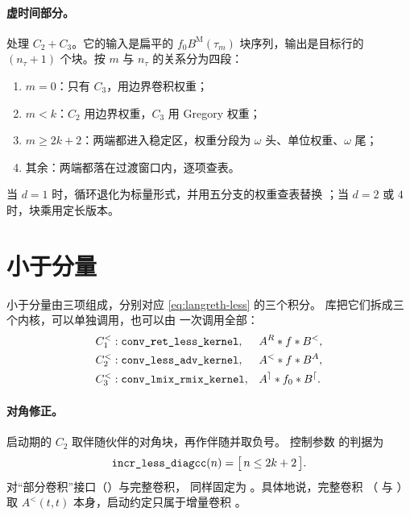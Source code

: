 \paragraph{虚时间部分。}
 处理 $C_2+C_3$。它的输入是扁平的
$f_0 B^{\mathrm{M}}(\tau_m)$ 块序列，输出是目标行的
$(n_\tau+1)$ 个块。按 $m$ 与 $n_\tau$ 的关系分为四段：
\begin{enumerate}[label=(\arabic*)]
    \item $m=0$：只有 $C_3$，用边界卷积权重；
    \item $m<k$：$C_2$ 用边界权重，$C_3$ 用 Gregory 权重；
    \item $m\ge 2k+2$：两端都进入稳定区，权重分段为
          $\omega$ 头、单位权重、$\omega$ 尾；
    \item 其余：两端都落在过渡窗口内，逐项查表。
\end{enumerate}
当 $d=1$ 时，循环退化为标量形式，并用五分支的权重查表替换
；当 $d=2$ 或 $4$ 时，块乘用定长版本。

\section{小于分量}
\label{sec:less-kernel}

小于分量由三项组成，分别对应 \cref{eq:langreth-less} 的三个积分。
库把它们拆成三个内核，可以单独调用，也可以由
 一次调用全部：
\begin{align}
    C^{<}_1 &: \code{conv_ret_less_kernel}, &
        & A^{R} * f * B^{<},\\
    C^{<}_2 &: \code{conv_less_adv_kernel}, &
        & A^{<} * f * B^{A},\\
    C^{<}_3 &: \code{conv_lmix_rmix_kernel}, &
        & A^{\rceil} * f_0 * B^{\lceil}.
\end{align}

\paragraph{对角修正。}
启动期的 $C_2$ 取伴随伙伴的对角块，再作伴随并取负号。
控制参数  的判据为
\begin{equation}
    \code{incr_less_diagcc}(n) = \big[\,n\le 2k+2\,\big].
\end{equation}
对“部分卷积”接口（）与完整卷积，
 同样固定为 。具体地说，完整卷积
（ 与 ）取
$A^{<}(t,t)$ 本身，启动约定只属于增量卷积
。

